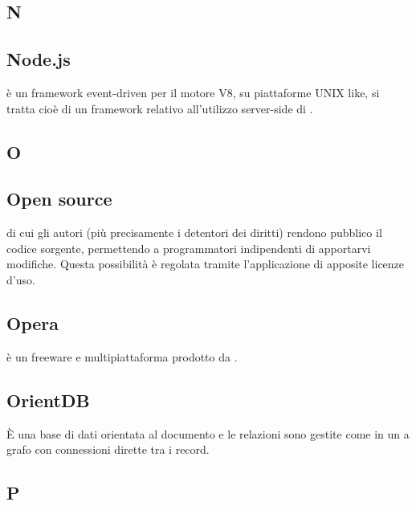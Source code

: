 \newpage

\begin{center}
\Huge\section*{\uppercase{N}}
\end{center}

\subsection*{Node.js}
 è un framework event-driven per il motore  V8, su piattaforme UNIX
like, si tratta cioè di un framework relativo all'utilizzo server-side di .

\newpage

\begin{center}
\Huge\section*{\uppercase{O}}
\end{center}

\subsection*{Open source}
 di cui gli autori (più precisamente i detentori dei diritti) rendono pubblico
il codice sorgente, permettendo a programmatori indipendenti di apportarvi modifiche.
Questa possibilità è regolata tramite l'applicazione di apposite licenze d'uso.

\subsection*{Opera}
 è un   freeware e multipiattaforma prodotto da  .

\subsection*{OrientDB}
È una base di dati orientata al documento e le relazioni sono gestite come in un  a grafo con connessioni dirette tra i record.

\newpage

\begin{center}
\Huge\section*{\uppercase{P}}
\end{center}

